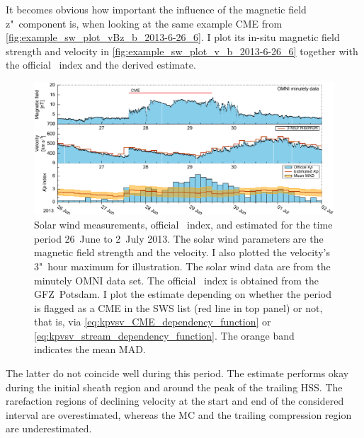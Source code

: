 It becomes obvious how important the influence of the magnetic field z"~component is, when looking at the same example CME from \autoref{fig:example_sw_plot_vBz_b_2013-6-26_6}. I plot its in-situ magnetic field strength and velocity in \autoref{fig:example_sw_plot_v_b_2013-6-26_6} together with the official \Kp{}~index and the derived \Kp{} estimate.
\begin{figure}[htb]
	\centering
	\includegraphics[width=\textwidth]{figures_of_mine/chapter2/example_sw_plot_v_b_2013-6-26_6.pdf}
	\caption[]
	{Solar wind measurements, official \Kp{}~index, and estimated \Kp{} for the time period 26~June to 2~July 2013. The solar wind parameters are the magnetic field strength and the velocity. I also plotted the velocity's 3"~hour maximum for illustration. The solar wind data are from the minutely OMNI data set. The official \Kp{}~index is obtained from the GFZ~Potsdam. I plot the \Kp{} estimate depending on whether the period is flagged as a CME in the SWS list (red line in top panel) or not, that is, via \autoref{eq:kpvsv_CME_dependency_function} or \autoref{eq:kpvsv_stream_dependency_function}. The orange band indicates the mean MAD.}
	\label{fig:example_sw_plot_v_b_2013-6-26_6}
\end{figure}
The latter do not coincide well during this period. The \Kp{} estimate performs okay during the initial sheath region and around the peak of the trailing HSS. The rarefaction regions of declining velocity at the start and end of the considered interval are overestimated, whereas the MC and the trailing compression region are underestimated.

